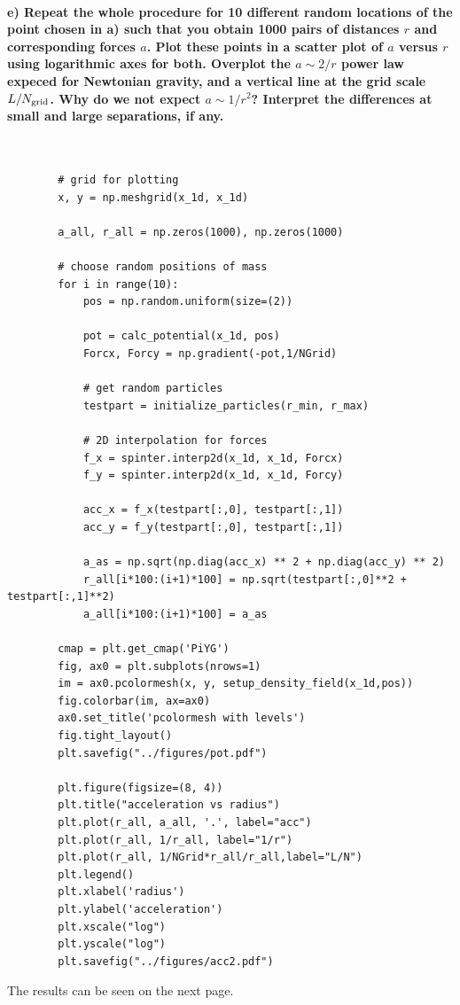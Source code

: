 \newpage
\paragraph{e) Repeat the whole procedure for 10 different random locations of 
    the point chosen in a) such that you obtain 1000 pairs of distances $r$ and 
    corresponding forces $a$. Plot these points in a scatter plot of $a$ versus
    $r$ using logarithmic axes for both. Overplot the $a\sim2/r$ power law 
    expeced for Newtonian gravity, and a vertical line at the grid scale 
    $L/N_\textnormal{grid}$. Why do we not expect $a\sim1/r^2$? Interpret the 
    differences at small and large separations, if any.
} \ \\
    \begin{lstlisting}
        # grid for plotting
        x, y = np.meshgrid(x_1d, x_1d)

        a_all, r_all = np.zeros(1000), np.zeros(1000)

        # choose random positions of mass
        for i in range(10):
            pos = np.random.uniform(size=(2))

            pot = calc_potential(x_1d, pos)
            Forcx, Forcy = np.gradient(-pot,1/NGrid)

            # get random particles
            testpart = initialize_particles(r_min, r_max)

            # 2D interpolation for forces
            f_x = spinter.interp2d(x_1d, x_1d, Forcx)
            f_y = spinter.interp2d(x_1d, x_1d, Forcy)
        
            acc_x = f_x(testpart[:,0], testpart[:,1])
            acc_y = f_y(testpart[:,0], testpart[:,1])

            a_as = np.sqrt(np.diag(acc_x) ** 2 + np.diag(acc_y) ** 2)
            r_all[i*100:(i+1)*100] = np.sqrt(testpart[:,0]**2 + testpart[:,1]**2)
            a_all[i*100:(i+1)*100] = a_as
        
        cmap = plt.get_cmap('PiYG')
        fig, ax0 = plt.subplots(nrows=1)
        im = ax0.pcolormesh(x, y, setup_density_field(x_1d,pos))
        fig.colorbar(im, ax=ax0)
        ax0.set_title('pcolormesh with levels')
        fig.tight_layout()
        plt.savefig("../figures/pot.pdf")

        plt.figure(figsize=(8, 4))
        plt.title("acceleration vs radius")
        plt.plot(r_all, a_all, '.', label="acc")
        plt.plot(r_all, 1/r_all, label="1/r")
        plt.plot(r_all, 1/NGrid*r_all/r_all,label="L/N")
        plt.legend()
        plt.xlabel('radius')
        plt.ylabel('acceleration')
        plt.xscale("log")
        plt.yscale("log")
        plt.savefig("../figures/acc2.pdf")\end{lstlisting}
        The results can be seen on the next page.

